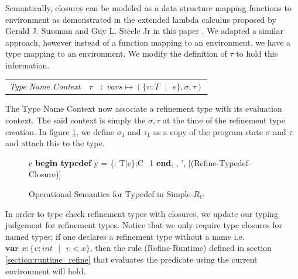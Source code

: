 \documentclass[a4paper,12pt]{report}
\begin{document}
\par
Semantically, closures can be modeled as a data structure mapping 
functions to environment as demonstrated in the extended lambda calculus proposed by 
Gerald J. Sussman and Guy L. Steele Jr in this paper \cite{closureLambdaOp}. We 
adapted a similar approach, however instead of a function mapping to an 
environment, we have a type mapping to an environment. We modify the 
definition of $\tau$ to hold this information.

\begin{center}
   \begin{tabular} {c c c}
     \textit{Type Name Context} & $\tau$& $:$ 
     $vars \mapsto (\{\upsilon : T\text{ }|\text{ }e\}, \sigma, \tau)$ \\
   \end{tabular}
\end{center}

The Type Name Context now associate a refinement type with its 
evaluation context. The said context is simply the $\sigma, \tau$ at the time of 
the refinement type creation. 
In figure \ref{fig:typedef_simple_rc}, we define $\sigma_1$ and $\tau_1$ 
as a copy of the program state $\sigma$ and $\tau$ and attach this to the type. 

\begin{figure}[H]
  \begin{center}
    \begin{tabular} {c}
      {\langle\textbf{begin typedef } y = \{\upsilon : T\text{ }|\text{ }e\};C_1\textbf{ end}, 
      \sigma, \tau \rangle \longrightarrow \langle \sigma', \tau \rangle} [(Refine-Typedef-Closure)]
    \end{tabular}
  \end{center}
  \caption{Operational Semantics for Typedef in Simple-$R_C$}
  \label{fig:typedef_simple_rc}
\end{figure}

\par
In order to type check refinement types with closures, we update our typing 
judgement for refinement types. Notice that we only require type 
closures for named types; if one declares a refinement type without a name i.e.  
$\textbf{var }x : \{\upsilon : int\text{ }|\text{ }\upsilon < x\}$, then the rule 
(Refine-Runtime) defined in section \ref{section:runtime_refine} that evaluates 
the predicate using the current environment will hold. 
\end{document}
